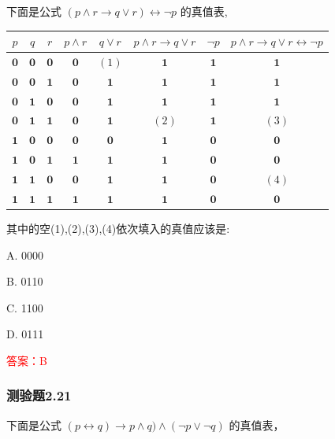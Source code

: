 \documentclass[UTF8, heading=true]{ctexart}
\begin{document}
下面是公式 $(p \wedge r \rightarrow q \vee r) \leftrightarrow \neg p$ 的真值表,
\begin{table}[htbp]
  \centering
\begin{tabular}{c|c|c|c|c|c|c|c}
\hline$p$ & $q$ & $r$ & $p \wedge r$ & $q \vee r$ & $p \wedge r \rightarrow q \vee r$ & $\neg p$ & $p \wedge r \rightarrow q \vee r \leftrightarrow \neg p$ \\
\hline $\mathbf{0}$ & $\mathbf{0}$ & $\mathbf{0}$ & $\mathbf{0}$ & $(1)$ & $\mathbf{1}$ & $\mathbf{1}$ & $\mathbf{1}$ \\
\hline $\mathbf{0}$ & $\mathbf{0}$ & $\mathbf{1}$ & $\mathbf{0}$ & $\mathbf{1}$ & $\mathbf{1}$ & $\mathbf{1}$ & $\mathbf{1}$ \\
\hline $\mathbf{0}$ & $\mathbf{1}$ & $\mathbf{0}$ & $\mathbf{0}$ & $\mathbf{1}$ & $\mathbf{1}$ & $\mathbf{1}$ & $\mathbf{1}$ \\
\hline $\mathbf{0}$ & $\mathbf{1}$ & $\mathbf{1}$ & $\mathbf{0}$ & $\mathbf{1}$ & $(2)$ & $\mathbf{1}$ & $(3)$ \\
\hline $\mathbf{1}$ & $\mathbf{0}$ & $\mathbf{0}$ & $\mathbf{0}$ & $\mathbf{0}$ & $\mathbf{1}$ & $\mathbf{0}$ & $\mathbf{0}$ \\
\hline $\mathbf{1}$ & $\mathbf{0}$ & $\mathbf{1}$ & $\mathbf{1}$ & $\mathbf{1}$ & $\mathbf{1}$ & $\mathbf{0}$ & $\mathbf{0}$ \\
\hline $\mathbf{1}$ & $\mathbf{1}$ & $\mathbf{0}$ & $\mathbf{0}$ & $\mathbf{1}$ & $\mathbf{1}$ & $\mathbf{0}$ & $(4)$ \\
\hline $\mathbf{1}$ & $\mathbf{1}$ & $\mathbf{1}$ & $\mathbf{1}$ & $\mathbf{1}$ & $\mathbf{1}$ & $\mathbf{0}$ & $\mathbf{0}$ \\
\hline
\end{tabular}
\end{table}

其中的空(1),(2),(3),(4)依次填入的真值应该是:

A. 0000

B. 0110

C. 1100

D. 0111

\textcolor{red}{答案：B}

\subsubsection{测验题2.21}

下面是公式 $(p \leftrightarrow q) \rightarrow p \wedge q) \wedge(\neg p \vee \neg q)$ 的真值表，
\end{document}
